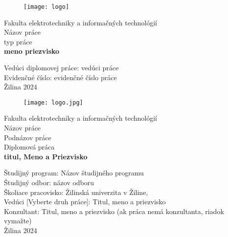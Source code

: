 \thispagestyle{empty} %
\begin{figure}[H] %
	\centering
	\texttt{[image: logo]}
\end{figure}

\begin{center} %
	\begin{Large}
		Fakulta elektrotechniky a informačných technológií \\

		\vspace{1.5cm}
		Názov práce \\
		\vspace{0.5cm}
		typ práce \\
		\vspace{2.5cm}
		\textbf{meno priezvisko} \\
		\vfill
	\end{Large}
\end{center}
Vedúci diplomovej práce: vedúci práce \\
Evidenčné číslo: evidenčné číslo práce \\
Žilina 2024 \\

\newpage
\thispagestyle{empty} %
\begin{figure}[H] %
	\centering
	\texttt{[image: logo.jpg]}
\end{figure}

\begin{center} %
	\begin{Large}
		Fakulta elektrotechniky a informačných technológií \\

		\vspace{2cm}
		Názov práce \\
		\vspace{0.5cm}
		Podnázov práce \\
		\vspace{0.75cm}
		Diplomová práca \\
		\vspace{3cm}
		\textbf{titul, Meno a Priezvisko} \\
		\vfill
	\end{Large}
\end{center}
Študijný program: Názov študijného programu \\
Študijný odbor: názov odboru \\
Školiace pracovisko: Žilinská univerzita v Žiline, \\
Vedúci [Vyberte druh práce]: Titul, meno a priezvisko \\
Konzultant: Titul, meno a priezvisko (ak práca nemá konzultanta, riadok vymažte) \\
Žilina 2024 \\